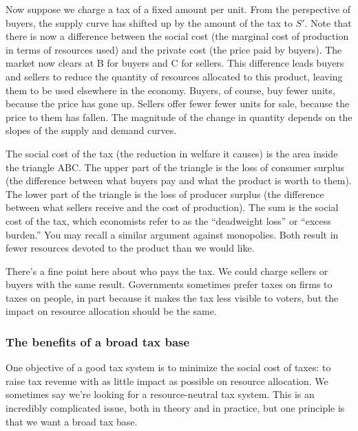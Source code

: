 \documentclass[letterpaper,12pt]{article}
\begin{document}
Now suppose we charge a tax of a fixed amount per unit.
From the perspective of buyers, the supply curve has shifted up
by the amount of the tax to $S'$.
Note that there is now a difference between the social cost
(the marginal cost of production in terms of resources used)
and the private cost (the price paid by buyers).
The market now clears at B for buyers and C for sellers.
This difference leads buyers and sellers to reduce the quantity
of resources allocated to this product,
leaving them to be used elsewhere in the economy.
Buyers, of course, buy fewer units, because the price has gone up.
Sellers offer fewer fewer units for sale,
because the price to them has fallen.
The magnitude of the change in quantity
depends on the slopes of the supply and demand curves.


The social cost of the tax (the reduction in welfare it causes)
is the area inside the triangle ABC.
The upper part of the triangle is the loss of consumer surplus
(the difference between what buyers pay and what the product is worth to them).
The lower part of the triangle is the loss of producer surplus
(the difference between what sellers receive and the cost of production).
The sum is the social cost of the tax,
which economists refer to as the ``deadweight loss'' or ``excess burden.''
You may recall a similar argument against monopolies.
Both result in fewer resources devoted to the product
than we would like.


There's a fine point here about who pays the tax.
We could charge sellers or buyers with the same result.
Governments sometimes prefer taxes on firms to taxes on
people, in part because it makes the tax less visible to voters,
but the impact on resource allocation should be the same.


\subsubsection*{The benefits of a broad tax base}


One objective of a good tax system is to minimize the social cost
of taxes:  to raise tax revenue with as little impact as possible
on resource allocation.
We sometimes say we're looking for a resource-neutral tax system.
This is an incredibly complicated issue, both in theory and in practice,
but one principle is that we want a broad tax base.
\end{document}
